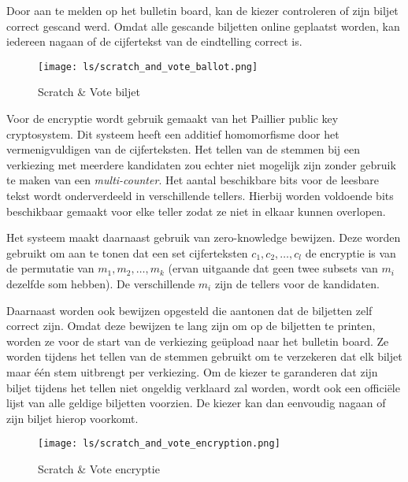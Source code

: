 \npar Door aan te melden op het bulletin board, kan de kiezer controleren of zijn biljet correct gescand werd. Omdat alle gescande biljetten online geplaatst worden, kan iedereen nagaan of de cijfertekst van de eindtelling correct is.

\begin{figure}
  \centering
  \texttt{[image: ls/scratch\_and\_vote\_ballot.png]}
  \caption[Scratch \& Vote biljet]{Scratch \& Vote biljet~\cite{adida_rivest_scratch_and_vote}}
  \label{fig:ls:scratch_and_vote_ballot}
\end{figure}

\npar Voor de encryptie wordt gebruik gemaakt van het Paillier public key cryptosystem. Dit systeem heeft een additief homomorfisme door het vermenigvuldigen van de cijferteksten. Het tellen van de stemmen bij een verkiezing met meerdere kandidaten zou echter niet mogelijk zijn zonder gebruik te maken van een \textit{multi-counter}. Het aantal beschikbare bits voor de leesbare tekst wordt onderverdeeld in verschillende tellers. Hierbij worden voldoende bits beschikbaar gemaakt voor elke teller zodat ze niet in elkaar kunnen overlopen.

\npar Het systeem maakt daarnaast gebruik van zero-knowledge bewijzen. Deze worden gebruikt om aan te tonen dat een set cijferteksten $c_1, c_2, \ldots, c_l$ de encryptie is van de permutatie van $m_1, m_2, \ldots, m_k$ (ervan uitgaande dat geen twee subsets van ${m_i}$ dezelfde som hebben). De verschillende ${m_i}$ zijn de tellers voor de kandidaten.

\npar Daarnaast worden ook bewijzen opgesteld die aantonen dat de biljetten zelf correct zijn. Omdat deze bewijzen te lang zijn om op de biljetten te printen, worden ze voor de start van de verkiezing ge\"upload naar het bulletin board. Ze worden tijdens het tellen van de stemmen gebruikt om te verzekeren dat elk biljet maar \'e\'en stem uitbrengt per verkiezing. Om de kiezer te garanderen dat zijn biljet tijdens het tellen niet ongeldig verklaard zal worden, wordt ook een offici\"ele lijst van alle geldige biljetten voorzien. De kiezer kan dan eenvoudig nagaan of zijn biljet hierop voorkomt.

\begin{figure}
  \centering
  \texttt{[image: ls/scratch\_and\_vote\_encryption.png]}
  \caption[Scratch \& Vote encryptie]{Scratch \& Vote encryptie~\cite{adida_rivest_scratch_and_vote}}
  \label{fig:ls:scratch_and_vote_encryption}
\end{figure}

